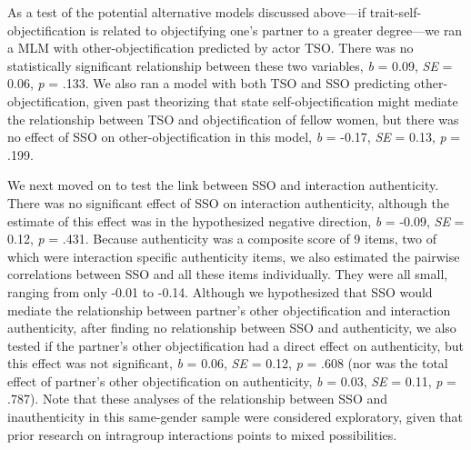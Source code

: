 \documentclass[man]{apa6}
\begin{document}
As a test of the potential alternative models discussed above---if
trait-self-objectification is related to objectifying one's partner to a
greater degree---we ran a MLM with other-objectification predicted by
actor TSO. There was no statistically significant relationship between
these two variables, \emph{b} = 0.09, \emph{SE} = 0.06, \emph{p} = .133.
We also ran a model with both TSO and SSO predicting
other-objectification, given past theorizing that state
self-objectification might mediate the relationship between TSO and
objectification of fellow women, but there was no effect of SSO on
other-objectification in this model, \emph{b} = -0.17, \emph{SE} = 0.13,
\emph{p} = .199.

We next moved on to test the link between SSO and interaction
authenticity. There was no significant effect of SSO on interaction
authenticity, although the estimate of this effect was in the
hypothesized negative direction, \emph{b} = -0.09, \emph{SE} = 0.12,
\emph{p} = .431. Because authenticity was a composite score of 9 items,
two of which were interaction specific authenticity items, we also
estimated the pairwise correlations between SSO and all these items
individually. They were all small, ranging from only -0.01 to -0.14.
Although we hypothesized that SSO would mediate the relationship between
partner's other objectification and interaction authenticity, after
finding no relationship between SSO and authenticity, we also tested if
the partner's other objectification had a direct effect on authenticity,
but this effect was not significant, \emph{b} = 0.06, \emph{SE} = 0.12,
\emph{p} = .608 (nor was the total effect of partner's other
objectification on authenticity, \emph{b} = 0.03, \emph{SE} = 0.11,
\emph{p} = .787). Note that these analyses of the relationship between
SSO and inauthenticity in this same-gender sample were considered
exploratory, given that prior research on intragroup interactions points
to mixed possibilities.
\end{document}
